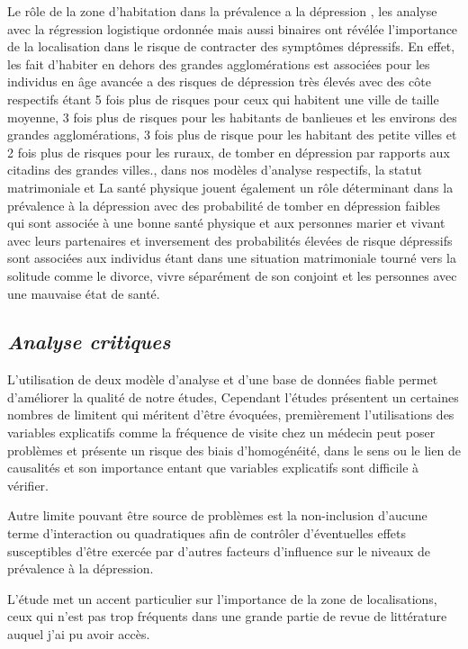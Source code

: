 \documentclass[a4paper]{article}
\begin{document}
Le rôle de la zone d’habitation dans la prévalence a la dépression , les analyse avec la régression logistique ordonnée mais aussi binaires ont révélée l’importance de la localisation dans le risque de contracter des symptômes dépressifs. En effet, les fait d’habiter en dehors des grandes agglomérations est associées pour les individus en âge avancée a des risques de dépression très élevés avec des côte respectifs étant
5 fois plus de risques pour  ceux qui habitent une ville de taille moyenne, 3 fois plus de risques pour les habitants de banlieues et les environs des grandes agglomérations, 3 fois plus de risque pour les habitant des petite villes et 2 fois plus de risques pour les ruraux, de tomber en dépression par rapports aux citadins des grandes villes., dans nos modèles d’analyse respectifs, la statut matrimoniale et La santé physique jouent également un rôle déterminant dans la prévalence à la dépression avec des probabilité de tomber en dépression faibles qui sont associée à une bonne santé physique et aux personnes marier et vivant avec leurs partenaires et inversement des probabilités élevées de risque dépressifs sont associées aux individus étant dans une situation matrimoniale tourné vers la solitude comme le divorce, vivre séparément de son conjoint et les personnes avec une mauvaise état de santé.

\subsection{\textbf{\textit{Analyse critiques}}} 

L’utilisation de deux modèle d’analyse et d’une base de données fiable permet d’améliorer la qualité de notre études, Cependant l’études présentent un certaines nombres de limitent qui méritent d’être évoquées, premièrement l’utilisations des variables explicatifs comme la fréquence de visite chez un médecin peut poser problèmes et présente un risque des biais d’homogénéité, dans le sens ou le lien de causalités et son importance entant que variables explicatifs sont difficile  à vérifier.

Autre limite pouvant être source de problèmes est la non-inclusion d’aucune terme d’interaction ou quadratiques afin de contrôler d’éventuelles effets susceptibles d’être exercée par d’autres facteurs d’influence sur le niveaux de prévalence à la dépression. 

L'étude met un accent particulier sur l’importance de la zone de localisations, ceux qui n’est pas trop fréquents dans une grande partie de revue de littérature auquel j’ai pu avoir accès.
\end{document}
